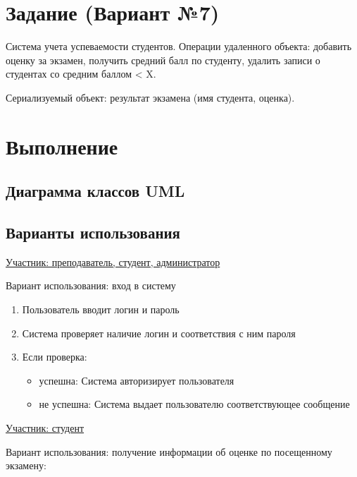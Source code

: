 \documentclass[utf8x, 12pt]{G7-32}
\begin{document}
\frontmatter 

\thispagestyle{empty}
\setcounter{page}{0}
\tableofcontents
\clearpage
\mainmatter



\chapter{Задание (Вариант №7)}

Система учета успеваемости студентов. Операции удаленного объекта: добавить оценку за экзамен, получить средний балл по студенту, удалить записи о студентах со средним баллом < X. 

Сериализуемый объект: результат экзамена (имя студента, оценка).



\chapter{Выполнение}

\section{Диаграмма классов UML}



\section{Варианты использования}


\underline{Участник: преподаватель, студент, администратор}

Вариант использования: вход в систему

\begin{enumerate}
	\item Пользователь вводит логин и пароль
	\item Система проверяет наличие логин и соответствия с ним пароля
	\item Если проверка:
	\begin{itemize}
		\item успешна: Система авторизирует пользователя
		\item не успешна: Система выдает пользователю соответствующее сообщение
	\end{itemize}
	
\end{enumerate}

\bigskip

\underline{Участник: студент}

Вариант использования: получение информации об оценке по посещенному экзамену:
\end{document}
